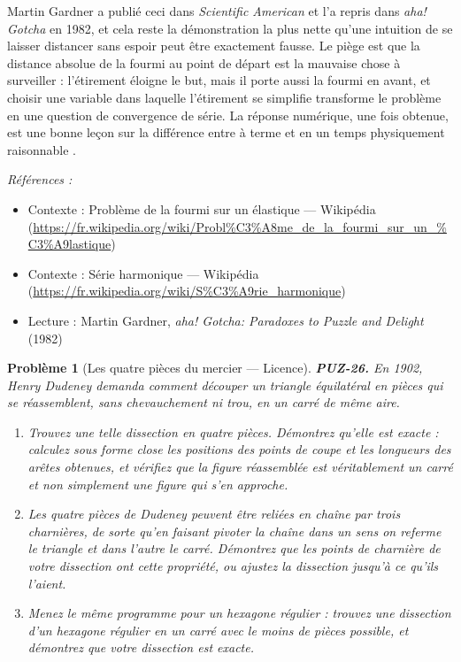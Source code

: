 \documentclass[11pt]{article}
\newtheorem{problem}{Problème}
\newenvironment{refs}{\par\small\noindent\emph{Références :}\begin{itemize}\setlength\itemsep{0pt}}{\end{itemize}\normalsize}
\begin{document}
\noindent Martin Gardner a publié ceci dans \textit{Scientific American} et l'a repris dans \textit{aha! Gotcha} en 1982, et cela reste la démonstration la plus nette qu'une intuition de \og{} se laisser distancer sans espoir \fg{} peut être exactement fausse. Le piège est que la distance absolue de la fourmi au point de départ est la mauvaise chose à surveiller : l'étirement éloigne le but, mais il porte aussi la fourmi en avant, et choisir une variable dans laquelle l'étirement se simplifie transforme le problème en une question de convergence de série. La réponse numérique, une fois obtenue, est une bonne leçon sur la différence entre \og{} à terme \fg{} et \og{} en un temps physiquement raisonnable \fg{}.

\begin{refs}
\item Contexte : Problème de la fourmi sur un élastique --- Wikipédia (\url{https://fr.wikipedia.org/wiki/Probl%C3%A8me_de_la_fourmi_sur_un_%C3%A9lastique})
\item Contexte : Série harmonique --- Wikipédia (\url{https://fr.wikipedia.org/wiki/S%C3%A9rie_harmonique})
\item Lecture : Martin Gardner, \textit{aha! Gotcha: Paradoxes to Puzzle and Delight} (1982)
\end{refs}

\bigskip

\begin{problem}[{Les quatre pièces du mercier --- Licence}]
\textbf{PUZ-26.} En 1902, Henry Dudeney demanda comment découper un triangle équilatéral en pièces qui se réassemblent, sans chevauchement ni trou, en un carré de même aire.
\begin{enumerate}
\item[(a)] Trouvez une telle dissection en quatre pièces. Démontrez qu'elle est exacte : calculez sous forme close les positions des points de coupe et les longueurs des arêtes obtenues, et vérifiez que la figure réassemblée est véritablement un carré et non simplement une figure qui s'en approche.
\item[(b)] Les quatre pièces de Dudeney peuvent être reliées en chaîne par trois charnières, de sorte qu'en faisant pivoter la chaîne dans un sens on referme le triangle et dans l'autre le carré. Démontrez que les points de charnière de votre dissection ont cette propriété, ou ajustez la dissection jusqu'à ce qu'ils l'aient.
\item[(c)] Menez le même programme pour un hexagone régulier : trouvez une dissection d'un hexagone régulier en un carré avec le moins de pièces possible, et démontrez que votre dissection est exacte.
\end{enumerate}

\end{problem}
\end{document}

